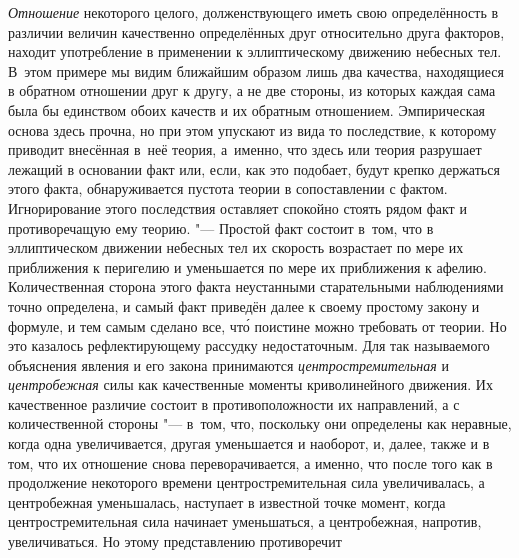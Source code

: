 {\em Отношение} некоторого целого, долженствующего иметь свою определённость в
различии величин качественно определённых друг относительно друга факторов,
находит употребление в применении к эллиптическому движению небесных тел.
В~этом примере мы видим ближайшим образом лишь два качества, находящиеся в
обратном отношении друг к другу, а не две стороны, из которых каждая сама была
бы единством обоих качеств и их обратным отношением. Эмпирическая основа здесь
прочна, но при этом упускают из вида то последствие, к которому приводит
внесённая в~неё теория, а~именно, что здесь или теория разрушает лежащий в
основании факт или, если, как это подобает, будут крепко держаться этого факта,
обнаруживается пустота теории в сопоставлении с фактом. Игнорирование этого
последствия оставляет спокойно стоять рядом факт и противоречащую ему теорию.
"--- Простой факт состоит в~том, что в эллиптическом движении небесных тел их
скорость возрастает по мере их приближения к перигелию и уменьшается по мере их
приближения к афелию. Количественная сторона этого факта неустанными
старательными наблюдениями точно определена, и самый факт приведён далее к
своему простому закону и формуле, и тем самым сделано все, чт\'{о} поистине
можно требовать от теории. Но это казалось рефлектирующему рассудку
недостаточным. Для так называемого объяснения явления и его закона принимаются
{\em центростремительная} и {\em центробежная} силы как качественные моменты
криволинейного движения. Их качественное различие состоит в противоположности
их направлений, а с количественной стороны "--- в~том, что, поскольку они
определены как неравные, когда одна увеличивается, другая уменьшается и
наоборот, и, далее, также и в том, что их отношение снова переворачивается, а
именно, что после того как в продолжение некоторого времени центростремительная
сила увеличивалась, а центробежная уменьшалась, наступает в известной точке
момент, когда центростремительная сила начинает уменьшаться, а центробежная,
напротив, увеличиваться. Но этому представлению противоречит
